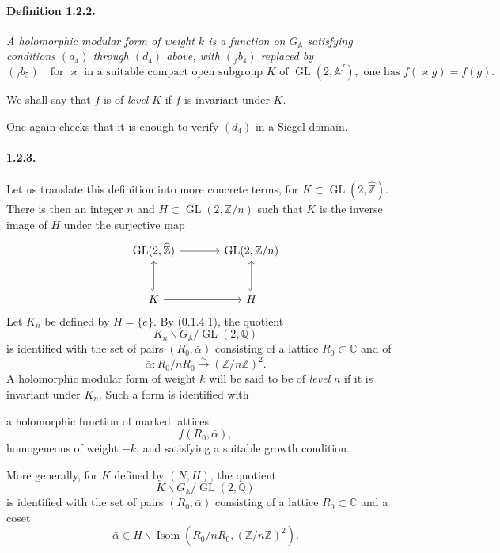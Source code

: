 \documentclass[10pt,a4paper]{article}
\providecommand{\GL}{\operatorname{GL}}
\providecommand{\Isom}{\operatorname{Isom}}
\providecommand{\Q}{\mathbb Q}
\providecommand{\Z}{\mathbb Z}
\providecommand{\C}{\mathbb C}
\providecommand{\Af}{\mathbb A^f}
\providecommand{\GA}{G_{\mathbb A}}
\providecommand{\iso}{\xrightarrow{\sim}}
\begin{document}
\paragraph{Definition 1.2.2.}{\itshape  A holomorphic modular form of weight $k$ is a function on $\GA$ satisfying conditions $(a_4)$ through $(d_4)$ above, with $({}_{f}b_4)$ replaced by
\[
({}_{f}b_5)\quad \text{for }\varkappa\text{ in a suitable compact open subgroup }K\text{ of }\GL(2,\Af),\text{ one has } f(\varkappa g)=f(g).
\]
\par}
We shall say that $f$ is of \emph{level} $K$ if $f$ is invariant under $K$.

One again checks that it is enough to verify $(d_4)$ in a Siegel domain.

\paragraph{1.2.3.} Let us translate this definition into more concrete terms, for $K\subset\GL(2,\widehat{\Z})$. There is then an integer $n$ and $H\subset\GL(2,\Z/n)$ such that $K$ is the inverse image of $H$ under the surjective map
\[
\begin{tikzcd}[row sep=large,column sep=large]
\GL(2,\widehat{\Z}) \arrow[r] & \GL(2,\Z/n)\\
K \arrow[u,hook] \arrow[r] & H \arrow[u,hook]
\end{tikzcd}
\]
Let $K_n$ be defined by $H=\{e\}$. By (0.1.4.1), the quotient
\[
K_n\backslash\GA/\GL(2,\Q)
\]
is identified with the set of pairs $(R_0,\bar\alpha)$ consisting of a lattice $R_0\subset\C$ and of
\[
\bar\alpha:R_0/nR_0\iso(\Z/n\Z)^2.
\]
A holomorphic modular form of weight $k$ will be said to be of \emph{level} $n$ if it is invariant under $K_n$. Such a form is identified with

\clearpage
{}
\hypertarget{authority-17}{}
a holomorphic function of marked lattices
\[
f(R_0,\bar\alpha),
\]
homogeneous of weight $-k$, and satisfying a suitable growth condition.

More generally, for $K$ defined by $(N,H)$, the quotient
\[
K\backslash\GA/\GL(2,\Q)
\]
is identified with the set of pairs $(R_0,\bar\alpha)$ consisting of a lattice $R_0\subset\C$ and a coset
\[
\bar\alpha\in H\backslash\Isom(R_0/nR_0,(\Z/n\Z)^2).
\]
\end{document}

